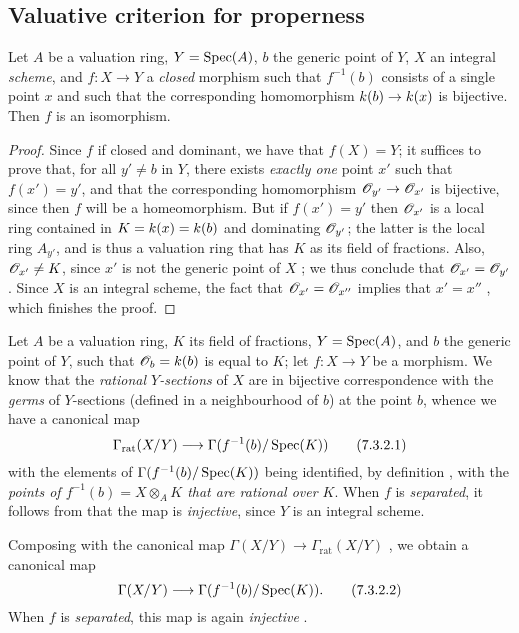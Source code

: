
\subsection{Valuative criterion for properness}
\label{subsection:II.7.3}

\begin{proposition}[7.3.1]
\label{II.7.3.1}
Let $A$ be a valuation ring, $Y=\operatorname{Spec}(A)$, $b$ the generic point of $Y$, $X$ an integral \emph{scheme}, and $f:X\to Y$ a \emph{closed} morphism such that $f^{-1}(b)$ consists of a single point $x$ and such that the corresponding homomorphism $\kres(b)\to\kres(x)$ is bijective.
Then $f$ is an isomorphism.
\end{proposition}

\begin{proof}
Since $f$ if closed and dominant, we have that $f(X)=Y$;
it suffices  to prove that, for all $y'\neq b$ in $Y$, there exists \emph{exactly one} point $x'$ such that $f(x')=y'$, and that the corresponding homomorphism $\sh{O}_{y'}\to\sh{O}_{x'}$ is bijective, since then $f$ will be a homeomorphism.
But if $f(x')=y'$ then $\mathscr{O}_{x'}$ is a local ring contained in $K=k(x)=k(b)$ and dominating $\mathscr{O}_{y'}$;
the latter is the local ring $A_{y'}$, and is thus a valuation ring  that has $K$ as its field of fractions.
Also, $\mathscr{O}_{x'}\neq K$, since $x'$ is not the generic point of $X$ ;
we thus conclude that $\mathscr{O}_{x'}=\mathscr{O}_{y'}$.
Since $X$ is an integral scheme, the fact that $\mathscr{O}_{x'}=\mathscr{O}_{x''}$ implies that $x'=x''$ , which finishes the proof.
\end{proof}

\begin{env}[7.3.2]
\label{II.7.3.2}
Let $A$ be a valuation ring, $K$ its field of fractions, $Y=\operatorname{Spec}(A)$, and $b$ the generic point of $Y$, such that $\mathscr{O}_b=k(b)$ is equal to $K$;
let $f:X\to Y$ be a morphism.
We know  that the \emph{rational $Y$-sections} of $X$ are in bijective correspondence with the \emph{germs} of $Y$-sections (defined in a neighbourhood of $b$) at the point $b$, whence we have a canonical map
\[
\label{II.7.3.2.1}
    \Gamma_\mathrm{rat}(X/Y) \to \Gamma(f^{-1}(b)/\Spec(K))
\tag{7.3.2.1}
\]
with the elements of $\Gamma(f^{-1}(b)/\operatorname{Spec}(K))$ being identified, by definition , with the \emph{points of $f^{-1}(b)=X\otimes_A K$ that are rational over $K$}.
When $f$ is \emph{separated}, it follows from  that the map  is \emph{injective}, since $Y$ is an integral scheme.

Composing  with the canonical map $\Gamma(X/Y)\to\Gamma_\mathrm{rat}(X/Y)$ , we obtain a canonical map
\[
\label{II.7.3.2.2}
    \Gamma(X/Y) \to \Gamma(f^{-1}(b)/\Spec(K)).
\tag{7.3.2.2}
\]
When $f$ is \emph{separated}, this map is again \emph{injective} .
\end{env}

